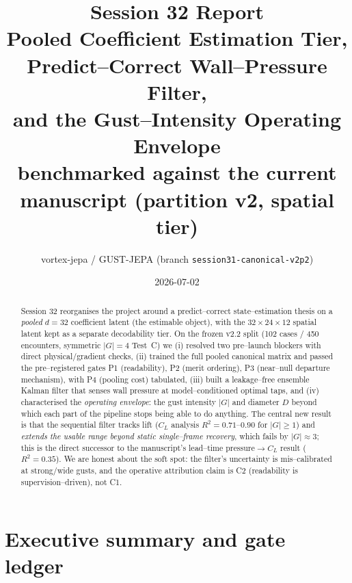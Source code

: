 \documentclass[11pt]{article}
\title{\textbf{Session 32 Report}\\[2pt]
\large Pooled Coefficient Estimation Tier, Predict--Correct Wall--Pressure Filter,\\
and the Gust--Intensity Operating Envelope\\[4pt]
\normalsize benchmarked against the current manuscript (partition v2, spatial tier)}
\author{vortex-jepa / GUST-JEPA \quad (branch \texttt{session31-canonical-v2p2})}
\date{2026-07-02}
\begin{document}
\maketitle

\begin{abstract}
Session 32 reorganises the project around a predict--correct state--estimation thesis on a
\emph{pooled} $d{=}32$ coefficient latent (the estimable object), with the $32{\times}24{\times}12$
spatial latent kept as a separate decodability tier. On the frozen v2.2 split (102 cases /
450 encounters, symmetric $|G|{=}4$ Test~C) we (i) resolved two pre--launch blockers with
direct physical/gradient checks, (ii) trained the full pooled canonical matrix and passed the
pre--registered gates P1 (readability), P2 (merit ordering), P3 (near--null departure
mechanism), with P4 (pooling cost) tabulated, (iii) built a leakage--free ensemble Kalman
filter that senses wall pressure at model--conditioned optimal taps, and (iv) characterised the
\emph{operating envelope}: the gust intensity $|G|$ and diameter $D$ beyond which each part of
the pipeline stops being able to do anything. The central new result is that the sequential
filter tracks lift ($C_L$ analysis $R^2 = 0.71$--$0.90$ for $|G|\ge 1$) and \emph{extends the
usable range beyond static single--frame recovery}, which fails by $|G|\approx 3$; this is the
direct successor to the manuscript's lead--time pressure$\to C_L$ result ($R^2 = 0.35$). We are
honest about the soft spot: the filter's uncertainty is mis--calibrated at strong/wide gusts,
and the operative attribution claim is C2 (readability is supervision--driven), not C1.
\end{abstract}

\section{Executive summary and gate ledger}
\end{document}
